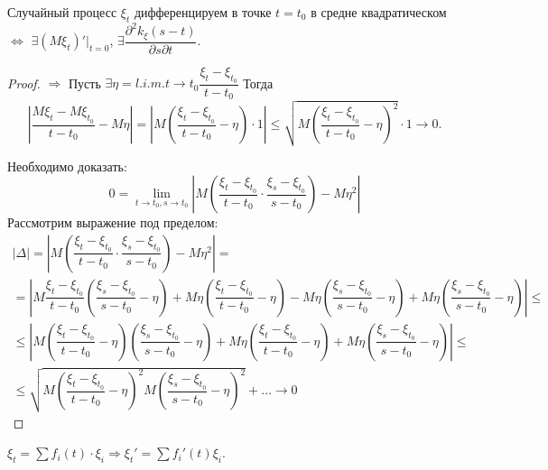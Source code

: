 \begin{theorem}
  Случайный процесс $\xi_t$ дифференцируем в точке $t = t_0$ в средне квадратическом
  $\Leftrightarrow$ $\exists (M\xi_t)' |_{t=0}$, $\exists \dfrac{\partial^2 k_\xi(s-t)}{\partial s \partial t}$.
\end{theorem}
\begin{proof}
  $\Rightarrow$ Пусть $\exists \eta = l.i.m. {t\to t_0} \dfrac{\xi_t - \xi_{t_0}}{t-t_0}$
  Тогда
  \[
    \left| \dfrac{M\xi_t - M\xi_{t_0}}{t-t_0} - M\eta \right|
    = \left| M \left( \dfrac{\xi_t - \xi_{t_0}}{t-t_0} - \eta \right) \cdot 1 \right| 
    \leqslant \sqrt{M \left( \dfrac{\xi_t - \xi_{t_0}}{t-t_0} - \eta \right)^2 } \cdot 1
    \to 0.
  \]
    
  Необходимо доказать:
  \[
    0 = \lim_{t\to t_0, s\to t_0} \left| M \left( \dfrac{\xi_t - \xi_{t_0}}{t-t_0} \cdot \dfrac{\xi_s - \xi_{t_0}}{s-t_0} \right) - M\eta^2 \right| 
  \]
  Рассмотрим выражение под пределом:
  \begin{multline*}
    |\Delta| = \left| M \left( \dfrac{\xi_t - \xi_{t_0}}{t-t_0} \cdot \dfrac{\xi_s - \xi_{t_0}}{s-t_0} \right) - M\eta^2 \right|  = \\
    = \left|
      M \dfrac{\xi_t - \xi_{t_0}}{t-t_0} \left( \dfrac{\xi_s - \xi_{t_0}}{s-t_0} - \eta \right)
      + M\eta \left( \dfrac{\xi_t - \xi_{t_0}}{t-t_0} - \eta \right) 
      - M \eta \left(\dfrac{\xi_s - \xi_{t_0}}{s-t_0} - \eta\right)
      + M \eta \left( \dfrac{\xi_s - \xi_{t_0}}{s-t_0} - \eta \right)  \right| \leqslant \\
      \leqslant \left| 
      M \left(\dfrac{\xi_t - \xi_{t_0}}{t-t_0}- \eta \right) \left( \dfrac{\xi_s - \xi_{t_0}}{s-t_0}-\eta \right)
      + M \eta \left( \dfrac{\xi_t - \xi_{t_0}}{t-t_0} - \eta \right) + M\eta \left( \dfrac{\xi_s - \xi_{t_0}}{s-t_0} - \eta \right)\right|
      \leqslant \\ \leqslant
      \sqrt{M \left( \dfrac{\xi_t - \xi_{t_0}}{t-t_0} -\eta \right)^2 M \left( \dfrac{\xi_s - \xi_{t_0}}{s-t_0} - \eta \right) ^2 } + \dots \to 0
  \end{multline*}
\end{proof}

\begin{remark}
  $\xi_t = \sum f_i (t) \cdot \xi_i \Rightarrow \xi_t ' = \sum f_i'(t) \xi_i$.
\end{remark}

